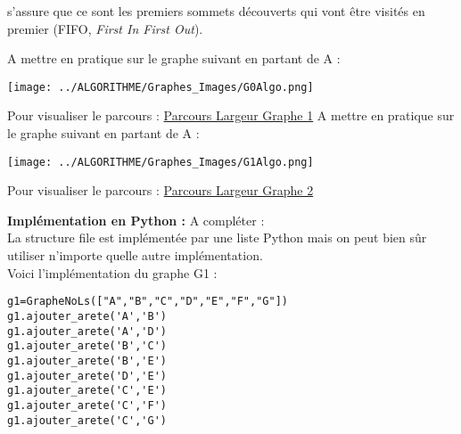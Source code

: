 \documentclass[12pt]{book}
\begin{document}

s'assure que ce sont les premiers sommets découverts qui vont être
visités en premier (FIFO, \emph{First In First Out}).

\Quest[1] A mettre en pratique sur le graphe suivant en partant de A : 

\texttt{[image: ../ALGORITHME/Graphes\_Images/G0Algo.png]} 

Pour visualiser le parcours : \href{http://graphonline.ru/fr/home?graph=lrKWNaYUXjRDAwGcZZcst}{Parcours Largeur Graphe 1}
\Quest A mettre en pratique sur le graphe suivant en partant de A : 

\texttt{[image: ../ALGORITHME/Graphes\_Images/G1Algo.png]} 

Pour visualiser le parcours : \href{http://graphonline.ru/fr/home?graph=iDTFdMBwUVWDnJBhZZcst}{Parcours Largeur Graphe 2}

\Quest \textbf{Implémentation en Python : } A compléter :\\
La structure file est implémentée par une liste Python mais on peut bien sûr utiliser n'importe quelle autre implémentation.\\

Voici l'implémentation du graphe G1 : 
\begin{lstlisting}
g1=GrapheNoLs(["A","B","C","D","E","F","G"])
g1.ajouter_arete('A','B')
g1.ajouter_arete('A','D')
g1.ajouter_arete('B','C')
g1.ajouter_arete('B','E')
g1.ajouter_arete('D','E')
g1.ajouter_arete('C','E')
g1.ajouter_arete('C','F')
g1.ajouter_arete('C','G')
\end{lstlisting}
\end{document}
